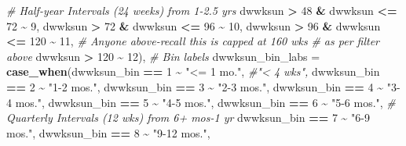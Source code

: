 \documentclass[
]{article}
\newenvironment{Shaded}{\begin{snugshade}}{\end{snugshade}}
\newcommand{\AttributeTok}[1]{\textcolor[rgb]{0.13,0.29,0.53}{#1}}
\newcommand{\CommentTok}[1]{\textcolor[rgb]{0.56,0.35,0.01}{\textit{#1}}}
\newcommand{\DecValTok}[1]{\textcolor[rgb]{0.00,0.00,0.81}{#1}}
\newcommand{\FunctionTok}[1]{\textcolor[rgb]{0.13,0.29,0.53}{\textbf{#1}}}
\newcommand{\NormalTok}[1]{#1}
\newcommand{\SpecialCharTok}[1]{\textcolor[rgb]{0.81,0.36,0.00}{\textbf{#1}}}
\newcommand{\StringTok}[1]{\textcolor[rgb]{0.31,0.60,0.02}{#1}}
\begin{document}
\begin{Shaded}
\begin{Highlighting}[]
                                 \CommentTok{\# Half{-}year Intervals (24 weeks) from 1{-}2.5 yrs}
\NormalTok{                                 dwwksun }\SpecialCharTok{\textgreater{}} \DecValTok{48} \SpecialCharTok{\&}\NormalTok{ dwwksun }\SpecialCharTok{\textless{}=} \DecValTok{72} \SpecialCharTok{\textasciitilde{}} \DecValTok{9}\NormalTok{, }
\NormalTok{                                 dwwksun }\SpecialCharTok{\textgreater{}} \DecValTok{72} \SpecialCharTok{\&}\NormalTok{ dwwksun }\SpecialCharTok{\textless{}=} \DecValTok{96} \SpecialCharTok{\textasciitilde{}} \DecValTok{10}\NormalTok{, }
\NormalTok{                                 dwwksun }\SpecialCharTok{\textgreater{}} \DecValTok{96} \SpecialCharTok{\&}\NormalTok{ dwwksun }\SpecialCharTok{\textless{}=} \DecValTok{120} \SpecialCharTok{\textasciitilde{}} \DecValTok{11}\NormalTok{, }
                                 \CommentTok{\# Anyone above{-}recall this is capped at 160 wks }
                                  \CommentTok{\# as per filter above}
\NormalTok{                                 dwwksun }\SpecialCharTok{\textgreater{}} \DecValTok{120} \SpecialCharTok{\textasciitilde{}} \DecValTok{12}\NormalTok{),}
         \CommentTok{\# Bin labels}
         \AttributeTok{dwwksun\_bin\_labs =} \FunctionTok{case\_when}\NormalTok{(dwwksun\_bin }\SpecialCharTok{==} \DecValTok{1} \SpecialCharTok{\textasciitilde{}} \StringTok{"\textless{}= 1 mo."}\NormalTok{, }\CommentTok{\#"\textless{} 4 wks",}
\NormalTok{                                 dwwksun\_bin }\SpecialCharTok{==} \DecValTok{2} \SpecialCharTok{\textasciitilde{}} \StringTok{"1{-}2 mos."}\NormalTok{,}
\NormalTok{                                 dwwksun\_bin }\SpecialCharTok{==} \DecValTok{3} \SpecialCharTok{\textasciitilde{}} \StringTok{"2{-}3 mos."}\NormalTok{,}
\NormalTok{                                 dwwksun\_bin }\SpecialCharTok{==} \DecValTok{4} \SpecialCharTok{\textasciitilde{}} \StringTok{"3{-}4 mos."}\NormalTok{, }
\NormalTok{                                 dwwksun\_bin }\SpecialCharTok{==} \DecValTok{5} \SpecialCharTok{\textasciitilde{}} \StringTok{"4{-}5 mos."}\NormalTok{,}
\NormalTok{                                 dwwksun\_bin }\SpecialCharTok{==} \DecValTok{6} \SpecialCharTok{\textasciitilde{}} \StringTok{"5{-}6 mos."}\NormalTok{,}
                                 \CommentTok{\# Quarterly Intervals (12 wks) from 6+ mos{-}1 yr}
\NormalTok{                                 dwwksun\_bin }\SpecialCharTok{==} \DecValTok{7} \SpecialCharTok{\textasciitilde{}} \StringTok{"6{-}9 mos."}\NormalTok{,}
\NormalTok{                                 dwwksun\_bin }\SpecialCharTok{==} \DecValTok{8} \SpecialCharTok{\textasciitilde{}} \StringTok{"9{-}12 mos."}\NormalTok{, }

\end{Highlighting}
\end{Shaded}
\end{document}
